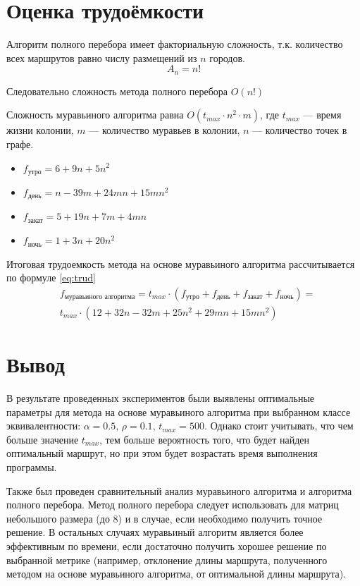 \section{Оценка трудоёмкости}



Алгоритм полного перебора имеет факториальную сложность, т.к. количество всех маршрутов равно числу размещений из $n$ городов.
\begin{equation}
	A_n = n!
\end{equation}

Следовательно сложность метода полного перебора $O(n!)$

Сложность муравьиного алгоритма равна $O(t_{max}\cdot n^2 \cdot m)$, где $t_{max}$ --- время жизни колонии, $m$ --- количество муравьев в колонии, $n$ --- количество точек в графе.

\begin{itemize}[label=---]
	\item $f_{\text{утро}} =  6 +  9n       + 5n^2$
	\item $f_{\text{день}} =	    n - 39m          + 24mn + 15mn^2 $
	\item $f_{\text{закат}} = 5 + 19n + 7m           + 4mn$
	\item $f_{\text{ночь}} =  1 +  3n       + 20n^2$
\end{itemize}

Итоговая трудоемкость метода на основе муравьиного алгоритма рассчитывается по формуле \eqref{eq:trud}
\begin{equation}
	\label{eq:trud}
\begin{array}{cc}
	&f_{\text{муравьиного алгоритма}} =  t_{max} \cdot (f_{\text{утро}} + f_{\text{день}} + f_{\text{закат}} + f_{\text{ночь}}) = \\ 
	&t_{max} \cdot (12 + 32n - 32m + 25n^2 + 29mn + 15mn^2)
\end{array}
\end{equation}
\section{Вывод}

В результате проведенных экспериментов были выявлены оптимальные параметры для метода на основе муравьиного алгоритма при выбранном классе эквивалентности: $\alpha = 0.5$, $\rho = 0.1$, $ t_{max} = 500$. 
Однако стоит учитывать, что чем больше значение $t_{max}$, тем больше вероятность того, что будет найден оптимальный маршрут, но при этом будет возрастать время выполнения программы. 

Также был проведен сравнительный анализ муравьиного алгоритма и алгоритма полного перебора. 
Метод полного перебора следует использовать для матриц небольшого размера (до 8) и в случае, если необходимо получить точное решение. 
В остальных случаях муравьиный алгоритм является более эффективным по времени, если достаточно получить хорошее решение по выбранной метрике (например, отклонение длины маршрута, полученного методом на основе муравьиного алгоритма, от оптимальной длины маршрута).


